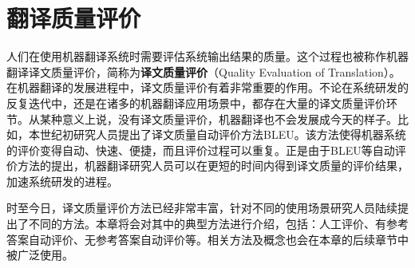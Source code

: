 
%


\renewcommand\figurename{图}%
\renewcommand\tablename{表}%


\chapter{翻译质量评价}

\parinterval 人们在使用机器翻译系统时需要评估系统输出结果的质量。这个过程也被称作机器翻译译文质量评价，简称为{\small\sffamily\bfseries{译文质量评价}}（Quality Evaluation of Translation）。在机器翻译的发展进程中，译文质量评价有着非常重要的作用。不论在系统研发的反复迭代中，还是在诸多的机器翻译应用场景中，都存在大量的译文质量评价环节。从某种意义上说，没有译文质量评价，机器翻译也不会发展成今天的样子。比如，本世纪初研究人员提出了译文质量自动评价方法BLEU。该方法使得机器系统的评价变得自动、快速、便捷，而且评价过程可以重复。正是由于BLEU等自动评价方法的提出，机器翻译研究人员可以在更短的时间内得到译文质量的评价结果，加速系统研发的进程。

\parinterval 时至今日，译文质量评价方法已经非常丰富，针对不同的使用场景研究人员陆续提出了不同的方法。本章将会对其中的典型方法进行介绍，包括：人工评价、有参考答案自动评价、无参考答案自动评价等。相关方法及概念也会在本章的后续章节中被广泛使用。


